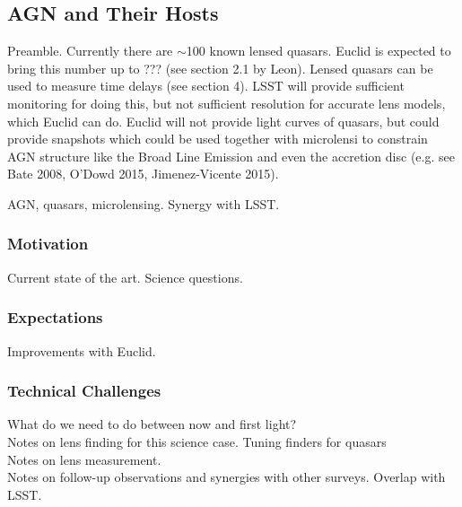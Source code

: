 \documentclass[twocolumn]{svjour3}
\begin{document}
\subsection{AGN and Their Hosts}



Preamble.
Currently there are $\sim$100 known lensed quasars.
Euclid is expected to bring this number up to ??? (see section 2.1 by Leon).
Lensed quasars can be used to measure time delays (see section 4).
LSST will provide sufficient monitoring for doing this, but not sufficient resolution for accurate lens models, which Euclid can do.
Euclid will not provide light curves of quasars, but could provide snapshots which could be used together with microlensi to constrain AGN structure like the Broad Line Emission and even the accretion disc (e.g. see Bate 2008, O'Dowd 2015, Jimenez-Vicente 2015).


AGN, quasars, microlensing.
Synergy with LSST.

\subsubsection{Motivation}
Current state of the art. Science questions.\\


\subsubsection{Expectations}
Improvements with Euclid.\\

\subsubsection{Technical Challenges}

What do we need to do between now and first light?\\

Notes on lens finding for this science case. Tuning finders for
quasars\\

Notes on lens measurement.\\

Notes on follow-up observations and synergies with other surveys.
Overlap with LSST.\\
\end{document}
